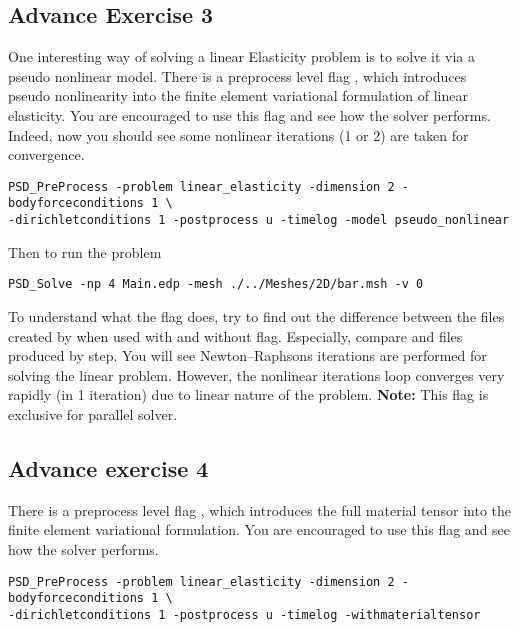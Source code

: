 \subsection{Advance Exercise  3}

One interesting way of solving a linear Elasticity problem is to solve
it via a pseudo nonlinear model. There is a preprocess level flag
, which introduces pseudo nonlinearity
into the finite element variational formulation of linear elasticity.
You are encouraged to use this flag and see how the solver performs.
Indeed, now you should see some nonlinear iterations (1 or 2) are taken
for convergence.

\begin{lstlisting}[style=BashInputStyle]
PSD_PreProcess -problem linear_elasticity -dimension 2 -bodyforceconditions 1 \
-dirichletconditions 1 -postprocess u -timelog -model pseudo_nonlinear
\end{lstlisting}

Then to run the problem

\begin{lstlisting}[style=BashInputStyle]
PSD_Solve -np 4 Main.edp -mesh ./../Meshes/2D/bar.msh -v 0
\end{lstlisting}

To understand what the flag does, try to find out the difference between
the files created by \psd{PSD\_PreProcess} when used with and without
\psd{-model pseudo\_nonlinear} flag. Especially, compare
 and
 files produced by
 step. You will see Newton--Raphsons iterations are
performed for solving the linear problem. However, the nonlinear
iterations loop converges very rapidly (in 1 iteration) due to linear
nature of the problem. \textbf{Note:} This flag is exclusive for
parallel solver.

\subsection{Advance exercise 4}

There is a preprocess level flag , which
introduces the full material tensor into the finite element variational
formulation. You are encouraged to use this flag and see how the solver
performs.

\begin{lstlisting}[style=BashInputStyle]
PSD_PreProcess -problem linear_elasticity -dimension 2 -bodyforceconditions 1 \
-dirichletconditions 1 -postprocess u -timelog -withmaterialtensor
\end{lstlisting}

